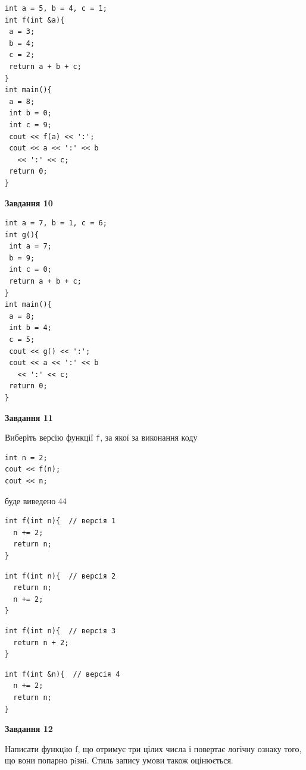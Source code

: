 \documentclass[12pt, ukrainian]{article}
\def\code#1{\Verb!#1!}
\begin{document}
{\begin {large}
\begin{minipage}[t]{7.0cm}
\begin{verbatim}
int a = 5, b = 4, c = 1;
int f(int &a){
 a = 3;
 b = 4;
 c = 2;
 return a + b + c;
}
int main(){
 a = 8;
 int b = 0;
 int c = 9;
 cout << f(a) << ':';
 cout << a << ':' << b 
   << ':' << c;
 return 0;
}
\end{verbatim}



\begin{center}
\textbf{Завдання 10}
\end{center}
\vspace{-8mm}

\begin{verbatim}
int a = 7, b = 1, c = 6;
int g(){
 int a = 7;
 b = 9;
 int c = 0;
 return a + b + c;
}
int main(){
 a = 8;
 int b = 4;
 c = 5;
 cout << g() << ':';
 cout << a << ':' << b 
   << ':' << c;
 return 0;
}
\end{verbatim}

\end{minipage}
\vline \hspace{1mm}
\begin{minipage}[t]{11.0cm}

\begin{center}
\textbf{Завдання 11}
\end{center}
Виберіть версію функції \code{f}, за якої за виконання коду
\begin{verbatim}
int n = 2;
cout << f(n);
cout << n;
\end{verbatim}

буде виведено 44

\begin{verbatim}
int f(int n){  // версія 1
  n += 2;
  return n;
}
\end{verbatim}

\vspace{-8mm}\begin{verbatim}
int f(int n){  // версія 2
  return n;
  n += 2;
}
\end{verbatim}

\vspace{-8mm}\begin{verbatim}
int f(int n){  // версія 3
  return n + 2;
}
\end{verbatim}

\vspace{-8mm}\begin{verbatim}
int f(int &n){  // версія 4
  n += 2;
  return n;
}
\end{verbatim}



\begin{center}
\textbf{Завдання 12}
\end{center}

Написати функцiю f, що отримує три цілих числа і повертає логічну ознаку того, що вони попарно рiзнi. Стиль запису умови також оцінюється.\par

\end{minipage}

\end {large}}
\newpage
\end{document}
